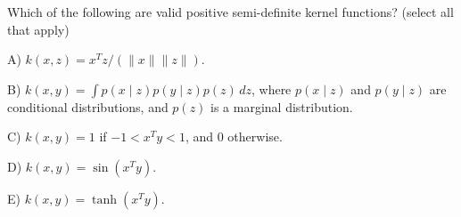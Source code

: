 Which of the following are valid positive semi-definite kernel functions? (select all that apply)


A) \(k(x,z)=x^Tz/(\|x\|\|z\|)\).


B) \(k(x,y)=\int p(x\mid z)p(y\mid z)p(z)\,dz\), where \(p(x\mid z)\) and \(p(y\mid z)\) are conditional distributions, and \(p(z)\) is a marginal distribution.


C) \(k(x,y)=1\) if \(-1<x^Ty<1\), and 0 otherwise.


D) \(k(x,y)=\sin(x^Ty)\).


E) \(k(x,y)=\tanh(x^Ty)\).

